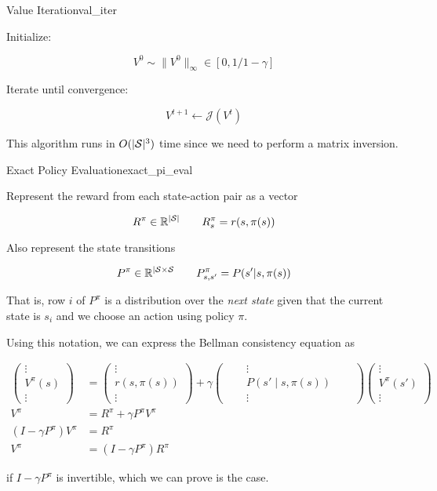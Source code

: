 \documentclass[../main/main]{subfiles}
\begin{document}
\begin{theorem}{Value Iteration}{val_iter}

Initialize:

\[
    V^0 \sim \|V^0\|_\infty \in [0, 1/1-\gamma]
\]

Iterate until convergence:

\[
    V^{t+1} \gets \mathcal{J}(V^t)
\]


This algorithm runs in $O(|\S|^3)$ time since we need to perform a matrix
inversion.

\end{theorem}





\begin{theorem}{Exact Policy Evaluation}{exact_pi_eval}

Represent the reward from each state-action pair as a vector

\[ R^\pi \in \R^{|\S|} \qquad R^\pi_s = r(s, \pi(s)) \]

Also represent the state transitions

\[ P^\pi \in \R^{|\S \times \S} \qquad P^\pi_{s, s'} = P(s' | s, \pi(s)) \]

That is, row $i$ of $P^\pi$ is a distribution over the \emph{next state}
given that the current state is $s_i$
and we choose an action using policy $\pi$.

Using this notation, we can express the Bellman consistency equation as

\begin{align*}
    \begin{pmatrix}
        \vdots \\ V^\pi(s) \\ \vdots
    \end{pmatrix}
    &=
    \begin{pmatrix}
        \vdots \\ r(s, \pi(s)) \\ \vdots
    \end{pmatrix}
    +
    \gamma
    \begin{pmatrix}
        & \vdots & \\
        \quad & P(s' \mid s, \pi(s)) & \quad \\
        & \vdots &
    \end{pmatrix}
    \begin{pmatrix}
        \vdots \\ V^\pi(s') \\ \vdots
    \end{pmatrix} \\
    V^\pi &= R^\pi + \gamma P^\pi V^\pi \\
    (I - \gamma P^\pi) V^\pi &= R^\pi \\
    V^\pi &= (I - \gamma P^\pi) R^\pi
\end{align*}

if $I - \gamma P^\pi$ is invertible, which we can prove is the case.


\end{theorem}
\end{document}
